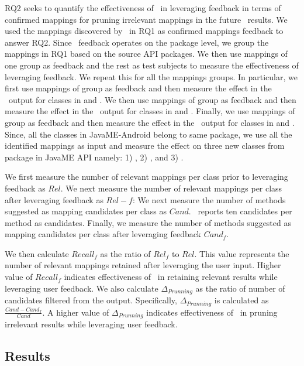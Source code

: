 RQ2 seeks to quantify the effectiveness of \tool\ in leveraging feedback in terms of confirmed mappings for pruning irrelevant mappings in the future \tool\ results. 
We used the mappings discovered by \tool\ in RQ1 as confirmed mappings feedback to answer RQ2.
Since \tool\ feedback operates on the package level, we group the mappings in RQ1 based on the source API packages.
We then use mappings of one group as feedback and the rest as test subjects to measure the effectiveness of leveraging feedback. 
We repeat this for all the mappings groups.
In particular, we first use mappings of   group as feedback and then measure the effect in the \tool\ output for classes in  and .
We then use mappings of   group as feedback and then measure the effect in the \tool\ output for classes in  and .
Finally, we use mappings of   group as feedback and then measure the effect in the \tool\ output for classes in  and .
Since, all the classes in JavaME-Android belong to same package, we use all the identified mappings as input and measure the effect on three new classes 
from  package in JavaME API namely: 1) , 2) , and 3) .

We first measure the number of relevant mappings per class prior to leveraging feedback as $Rel$.
We next measure the number of relevant mappings per class after leveraging feedback as $Rel-{f}$: 
We next measure the number of methods suggested as mapping candidates per class as $Cand$.
\tool\ reports ten candidates per method as candidates. 
Finally, we measure the number of methods suggested as mapping candidates per class after leveraging feedback $Cand_{f}$.

We then calculate $Recall_{f}$ as the ratio of $Rel_{f}$ to $Rel$. This value represents the number of relevant mappings retained after leveraging the user input. Higher value of $Recall_{f}$ indicates effectiveness of \tool\ in retaining relevant results while leveraging user feedback.
We also calculate $\Delta_{Prunning}$ as the ratio of number of candidates filtered from the output.  
Specifically, $\Delta_{Prunning}$ is calculated as $\frac{Cand-Cand_{f}}{Cand}$. A higher value of $\Delta_{Prunning}$ indicates effectiveness of \tool\ in pruning irrelevant results while leveraging user feedback. 


\subsection {Results}

